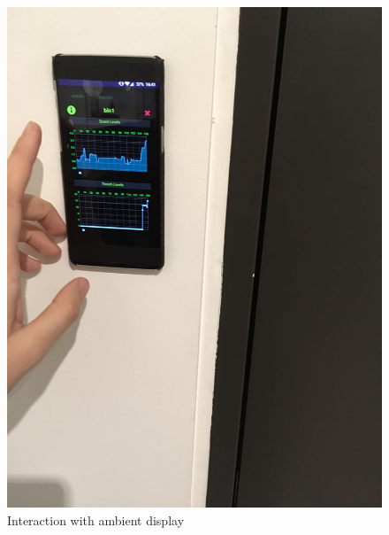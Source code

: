 \begin{figure}
\includegraphics[scale=.05]{img/IMG-20161130-WA0002}
\caption{Interaction with ambient display}
\label{fig:interaction}
\end{figure}
